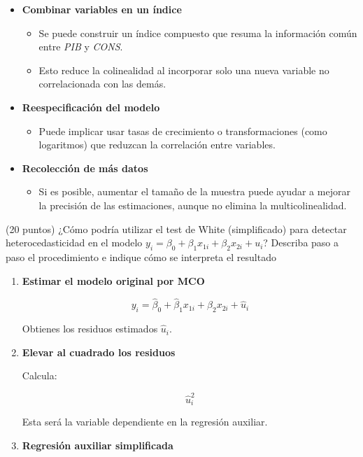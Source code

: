 \documentclass[10pt,a4paper]{article}
\begin{document}
\begin{enumerate}
{\begin{itemize}
    \item \textbf{Combinar variables en un índice}
    \begin{itemize}
        \item Se puede construir un índice compuesto que resuma la información común entre \textit{PIB} y \textit{CONS}.
        \item Esto reduce la colinealidad al incorporar solo una nueva variable no correlacionada con las demás.
    \end{itemize}

    \item \textbf{Reespecificación del modelo}
    \begin{itemize}
        \item Puede implicar usar tasas de crecimiento o transformaciones (como logaritmos) que reduzcan la correlación entre variables.
    \end{itemize}

    \item \textbf{Recolección de más datos}
    \begin{itemize}
        \item Si es posible, aumentar el tamaño de la muestra puede ayudar a mejorar la precisión de las estimaciones, aunque no elimina la multicolinealidad.
    \end{itemize}
\end{itemize}
{\color{black}
\item (20 puntos)
¿Cómo podría utilizar el test de White (simplificado) para detectar heterocedasticidad en el modelo \( y_i = \beta_0 + \beta_1 x_{1i} + \beta_2 x_{2i} + u_i \)? Describa paso a paso el procedimiento e indique cómo se interpreta el resultado

{\color{blue}
\begin{enumerate}
    \item \textbf{Estimar el modelo original por MCO}

    \[
    y_i = \hat{\beta}_0 + \hat{\beta}_1 x_{1i} + \hat{\beta}_2 x_{2i} + \hat{u}_i
    \]

    Obtienes los residuos estimados \( \hat{u}_i \).

    \item \textbf{Elevar al cuadrado los residuos}

    Calcula:

    \[
    \hat{u}_i^2
    \]

    Esta será la variable dependiente en la regresión auxiliar.

    \item \textbf{Regresión auxiliar simplificada}


\end{enumerate}}}}
\end{enumerate}
\end{document}
